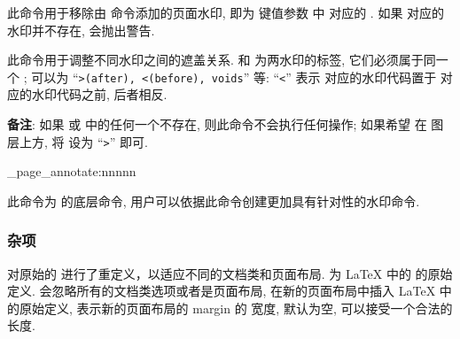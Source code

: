 \begin{function}[updated=2025-09-18]{\zpagemaskrm}
  \begin{syntax}
  \end{syntax}
  此命令用于移除由 \cmd{\zpagemask} 命令添加的页面水印,  即为 \cmd{\zpagemask} 键值参数
  中  对应的 . 如果  对应的水印并不存在, \ztex{} 会抛出警告.
\end{function}



\begin{function}[added=2025-09-18]{\zpagemaskrule}
  \begin{syntax}
  \cmd{\zpagemaskrule}
  \end{syntax}
  此命令用于调整不同水印之间的遮盖关系.  和 
  为两水印的标签, 它们必须属于同一个 ; 
  可以为 ``\verb|>(after), <(before), voids|'' 等: ``\verb|<|'' 表示  对应的水印代码置于
   对应的水印代码之前, 后者相反. \par
  \noindent \textbf{备注}: 如果  或  中的任何一个不存在, 则此命令不会执行任何操作;
  如果希望  在  图层上方, 将  设为 ``\verb|>|'' 即可.
\end{function}



\begin{function}[updated=2025-04-25]{\ztex_page_annotate:nnnnn}
  \begin{syntax}
     
      \qquad{}
      \qquad{}
  \end{syntax}
  此命令为 \cmd{\zpagemask} 的底层命令, 用户可以依据此命令创建更加具有针对性的水印命令.
\end{function}


\clearpage
\subsubsection{杂项}
\begin{function}[updated=2025-04-25]{\maketitle}
  \begin{syntax}
  \end{syntax}
  \ztex{} 对原始的  进行了重定义，以适应不同的文档类和页面布局.  为
  \LaTeX{} 中的  的原始定义. \texttt{} 会忽略所有的文档类选项或者是页面布局,
  在新的页面布局中插入 \LaTeX{} 中 \cmd{\maketitle} 的原始定义,  表示新的页面布局的 margin 的
  宽度, 默认为空, 可以接受一个合法的长度.
\end{function}


